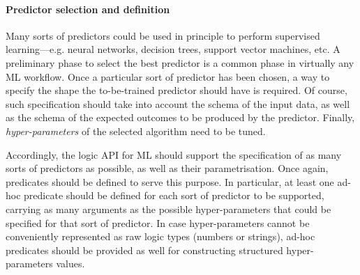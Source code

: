 \documentclass[
]{ceurart}
\begin{document}
\paragraph{Predictor selection and definition}
%
Many sorts of predictors could be used in principle to perform supervised learning---e.g. neural networks, decision trees, support vector machines, etc.
%
A preliminary phase to select the best predictor is a common phase in virtually any ML workflow.
%
Once a particular sort of predictor has been chosen, a way to specify the shape the to-be-trained predictor should have is required.
%
Of course, such specification should take into account the schema of the input data, as well as the schema of the expected outcomes to be produced by the predictor.
%
Finally, \emph{hyper-parameters} of the selected algorithm need to be tuned.
%

Accordingly, the logic API for ML should support the specification of as many sorts of predictors as possible, as well as their parametrisation.
%
Once again, predicates should be defined to serve this purpose.
%
In particular, at least one ad-hoc predicate should be defined for each sort of predictor to be supported, carrying as many arguments as the possible hyper-parameters that could be specified for that sort of predictor.
%
In case hyper-parameters cannot be conveniently represented as raw logic types (numbers or strings), ad-hoc predicates should be provided as well for constructing structured hyper-parameters values.

\end{document}
